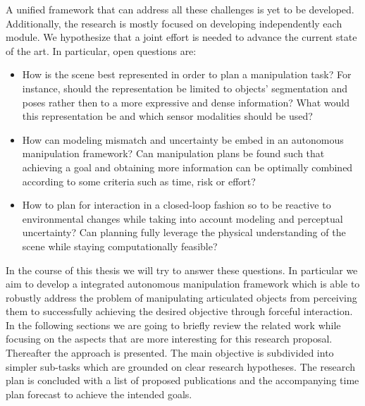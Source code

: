 \medskip 
A unified framework that can address all these challenges is yet to be developed. Additionally, the research is mostly focused on developing independently each module. We hypothesize that a joint effort is needed to advance the current state of the art. In particular, open questions are:
\begin{itemize}
\item How is the scene best represented in order to plan a manipulation task? For instance, should the representation be limited to objects' segmentation and poses rather then to a more expressive and dense information? What would this representation be and which sensor modalities should be used? 
\item How can modeling mismatch and uncertainty be embed in an autonomous manipulation framework? Can manipulation plans be found such that achieving a goal and obtaining more information can be optimally combined according to some criteria such as time, risk or effort?
\item How to plan for interaction in a closed-loop fashion so to be reactive to environmental changes while taking into account modeling and perceptual uncertainty? Can planning fully leverage the physical understanding of the scene while staying computationally feasible?
\end{itemize}

In the course of this thesis we will try to answer these questions. In particular we aim to develop a integrated autonomous manipulation framework which is able to robustly address the problem of manipulating articulated objects from perceiving them to successfully achieving the desired objective through forceful interaction. In the following sections we are going to briefly review the related work while focusing on the aspects that are more interesting for this research proposal. Thereafter the approach is presented. The main objective is subdivided into simpler sub-tasks which are grounded on clear research hypotheses. The research plan is concluded with a list of proposed publications and the accompanying time plan forecast to achieve the intended goals. 
